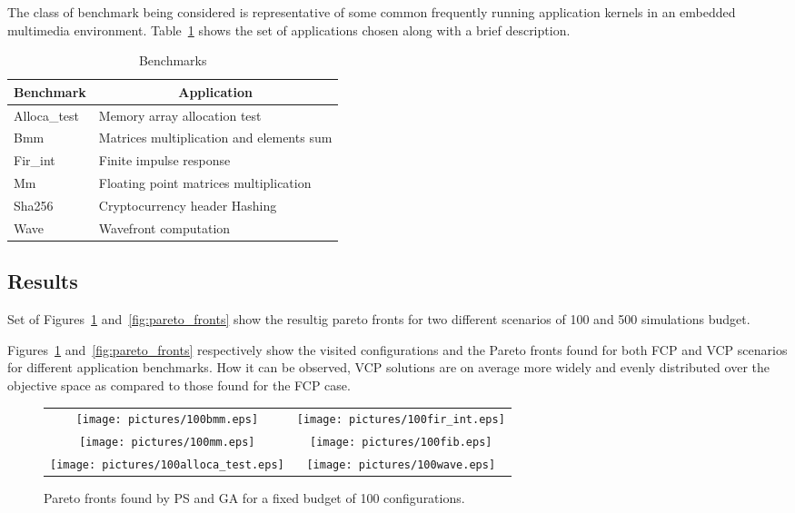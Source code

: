 \begin{itemize}
The class of benchmark being considered is representative of some common
frequently running application kernels in an embedded multimedia
environment. Table~\ref{tab:bench} shows the set of applications
chosen along with a brief description.
\begin{table}
	\centering
	\caption{Benchmarks}
	\label{tab:bench}
	\begin{tabular}{ll}
	\hline
	\multicolumn{1}{c}{Benchmark} & \multicolumn{1}{c}{Application} \\
	\hline
	Alloca\_test & Memory array allocation test \\
	Bmm & Matrices multiplication and elements sum \\
	Fir\_int & Finite impulse response \\
	Mm & Floating point matrices multiplication \\
	Sha256 & Cryptocurrency header Hashing \\
	Wave & Wavefront computation \\
	\hline
	\end{tabular}
\end{table}

\subsection{Results}

Set of Figures~\ref{fig:pareto_fronts_100}
and~\ref{fig:pareto_fronts} show the resultig pareto fronts for two
different scenarios of 100 and 500 simulations budget.


Figures~\ref{fig:pareto_fronts_100} and~\ref{fig:pareto_fronts}
respectively show the visited configurations and the
Pareto fronts found for both FCP and VCP scenarios for different
application benchmarks. How it can be observed, VCP solutions
are on average  more widely and evenly distributed over the objective
space as compared to those found for the FCP case.


\begin{figure}
  \centering
  \begin{tabular}{cc}
    \texttt{[image: pictures/100bmm.eps]} & \texttt{[image: pictures/100fir\_int.eps]} \\
    \texttt{[image: pictures/100mm.eps]} & \texttt{[image: pictures/100fib.eps]} \\
    \texttt{[image: pictures/100alloca\_test.eps]} & \texttt{[image: pictures/100wave.eps]}
  \end{tabular}
  \caption{Pareto fronts found by PS and GA for a fixed budget of 100 configurations.}
  \label{fig:pareto_fronts_100}
\end{figure}


\end{itemize}
